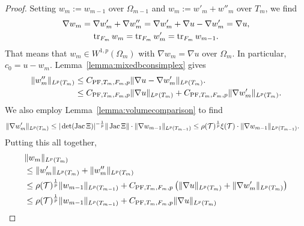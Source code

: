 \documentclass[12pt,a4paper]{article}
\begin{document}
\begin{proof}
    Setting $w_{m} := w_{m-1}$ over $\Omega_{m-1}$ and $w_{m} := w'_{m} + w''_{m}$ over $T_{m}$, 
    we find 
    \begin{gather*}
        \nabla w_{m} = \nabla w'_{m} + \nabla w''_{m} = \nabla w'_{m} + \nabla u - \nabla w'_{m} = \nabla u,
        \\
        \operatorname{tr}_{F_{m}} w_{m} = \operatorname{tr}_{F_{m}} w'_{m} = \operatorname{tr}_{F_{m}} w_{m-1}.
    \end{gather*}
    That means that $w_{m} \in W^{1,p}(\Omega_{m})$ with $\nabla w_{m} = \nabla u$ over $\Omega_{m}$. 
    In particular, $c_{0} = u - w_{m}$. 
    Lemma~\ref{lemma:mixedbconsimplex} gives 
    \begin{align*}
        \| w''_{m} \|_{L^{p}(T_{m})} 
        &
        \leq 
        C_{{\rm PF},T_{m},F_{m},p} \| \nabla u - \nabla w'_{m} \|_{L^{p}(T_{m})}.
        \\&
        \leq 
        C_{{\rm PF},T_{m},F_{m},p} \| \nabla u      \|_{L^{p}(T_{m})} 
        + 
        C_{{\rm PF},T_{m},F_{m},p} \| \nabla w'_{m} \|_{L^{p}(T_{m})} 
        .
    \end{align*}
    We also employ Lemma~\ref{lemma:volumecomparison} to find 
    \begin{align*}
        \| \nabla w'_{m} \|_{L^{p}(T_{m})}
        &\leq 
        |\det(\operatorname{{\rm Jac}} \Xi  )|^{-\frac 1 p} 
        \| \operatorname{{\rm Jac}} \Xi   \|
        \cdot 
        \| \nabla w_{m-1} \|_{L^{p}(T_{m-1})}
        \leq 
        \rho({\mathcal T})^{\frac 1 p} \xi({\mathcal T})
        \cdot 
        \| \nabla w_{m-1} \|_{L^{p}(T_{m-1})}
        .
    \end{align*}
    Putting this all together, 
    \begin{align*}
        &
        \| w_{m} \|_{L^{p}(T_{m})}
        \\&
        \leq  
        \| w'_{m} \|_{L^{p}(T_{m})}
        + 
        \| w''_{m} \|_{L^{p}(T_{m})}
        \\&
        \leq  
        \rho(\calT)^{\frac 1 p} 
        \| w_{m-1} \|_{L^{p}(T_{m-1})} 
        + 
        C_{{\rm PF},T_{m},F_{m},p} 
        \left( 
            \| \nabla u \|_{L^{p}(T_{m})} 
            + 
            \| \nabla w'_{m} \|_{L^{p}(T_{m})} 
        \right) 
        \\&
        \leq  
        \rho(\calT)^{\frac 1 p} 
        \| w_{m-1} \|_{L^{p}(T_{m-1})} 
        + 
        C_{{\rm PF},T_{m},F_{m},p} 
        \| \nabla u \|_{L^{p}(T_{m})} 

\end{align*}
\end{proof}
\end{document}
